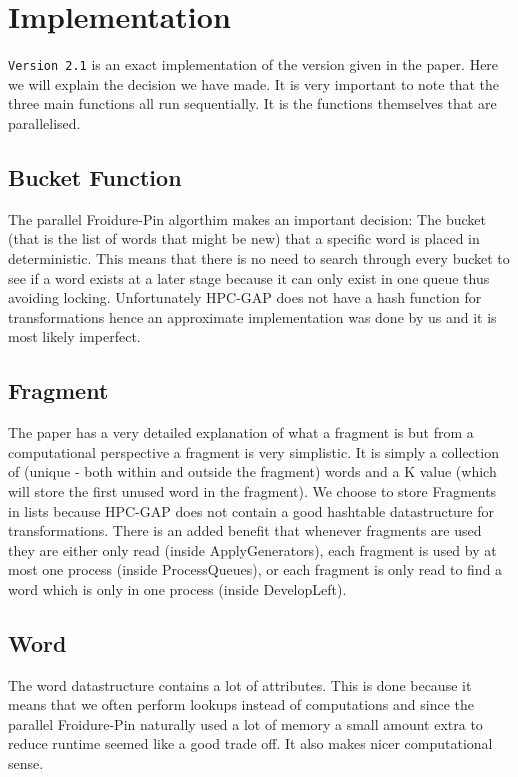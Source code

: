 \documentclass{report}
\begin{document}
\section*{Implementation}
\texttt{Version 2.1} is an exact implementation of the version given in the paper. Here we will explain the decision we have made. 
It is very important to note that the three main functions all run sequentially. It is the functions themselves that are parallelised. 

\subsection*{Bucket Function}
The parallel Froidure-Pin algorthim makes an important decision: The bucket (that is the list of words that might be new) that a specific word is placed in deterministic. This means that there is no need to search through every bucket to see if a word exists at a later stage because it can only exist in one queue thus avoiding locking. 
\newline
Unfortunately HPC-GAP does not have a hash function for transformations hence an approximate implementation was done by us and it is most likely imperfect.

\subsection*{Fragment}
The paper has a very detailed explanation of what a fragment is but from a computational perspective a fragment is very simplistic. It is simply a collection of (unique - both within and outside the fragment) words and a K value (which will store the first unused word in the fragment). 
\newline
We choose to store Fragments in lists because HPC-GAP does not contain a good hashtable datastructure for transformations. There is an added benefit that whenever fragments are used they are either only read (inside ApplyGenerators), each fragment is used by at most one process (inside ProcessQueues), or each fragment is only read to find a word which is only in one process (inside DevelopLeft).

\subsection*{Word}
The word datastructure contains a lot of attributes. This is done because it means that we often perform lookups instead of computations and since the parallel Froidure-Pin naturally used a lot of memory a small amount extra to reduce runtime seemed like a good trade off. It also makes nicer computational sense. 
\end{document}
